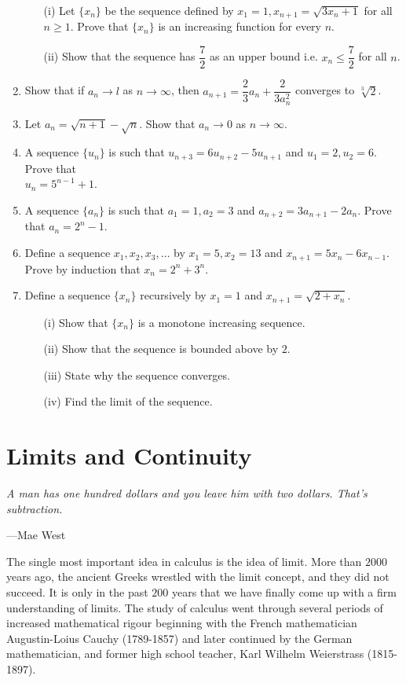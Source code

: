 \documentclass[titlepage,a4paper,12pt]{report}
\begin{document}
\begin{enumerate}
 \begin{itemize}
 \item[(i)] Let $\{x_n\}$ be the sequence defined by $x_1=1, x_{n+1}=\sqrt{3x_n+1}$ for all $n\geq 1$. Prove that $\{x_n\}$ is an increasing function for every $n$.
 \item[(ii)] Show that the sequence has $\dfrac{7}{2}$ as an upper bound i.e. $x_n \leq \dfrac{7}{2}$ for all $n$.
 \end{itemize}
 \item Show that if $a_n\rightarrow l$ as $n\rightarrow \infty$, then $a_{n+1}=\dfrac{2}{3}a_n +\dfrac{2}{3a_n ^2}$ converges to $\sqrt[3]{2}$.
 \item Let $a_n=\sqrt{n+1}-\sqrt{n}$. Show that $a_n\rightarrow 0$ as $n\rightarrow \infty$.
 \item A sequence $\{u_n\}$ is such that $u_{n+3}=6u_{n+2}-5u_{n+1}$ and $u_1=2, u_2=6$. Prove that\\ $u_n=5^{n-1}+1$.
 \item A sequence $\{a_n\}$ is such that $a_1=1, a_2=3$ and $a_{n+2}=3a_{n+1}-2a_n$. Prove that $a_n=2^n-1$.
 \item Define a sequence $x_1, x_2, x_3, \dots$ by $x_1=5, x_2=13$ and $x_{n+1}=5x_n-6x_{n-1}$. Prove by induction that $x_n=2^n+3^n$.
 \item Define a sequence $\{x_n\}$ recursively by $x_1=1$ and $x_{n+1}=\sqrt{2+x_n}$.
 \begin{itemize}
 \item[(i)] Show that $\{x_n\}$ is a monotone increasing sequence.
 \item[(ii)] Show that the sequence is bounded above by $2$.
 \item[(iii)] State why the sequence converges.
 \item[(iv)] Find the limit of the sequence.
 \end{itemize}
\end{enumerate}
\chapter{Limits and Continuity}
\begin{center}
	\small{\parbox{18cm}{
		\begin{raggedright}
		{\small
		\textit{A man has one hundred dollars and you leave him with two dollars.  That's subtraction.}
 }
 
				\vspace{.5cm}\hfill{---Mae West}
		\end{raggedright}
	}
} 
\end{center}
The single most important idea in calculus is the idea of limit. More than $2000$ years
ago, the ancient Greeks wrestled with the limit concept, and they did not succeed. It
is only in the past $200$ years that we have finally come up with a firm understanding
of limits. The study of calculus went through several periods of increased mathematical rigour beginning with the French mathematician Augustin-Loius Cauchy (1789-1857) and later continued by the German mathematician, and former high school teacher, Karl Wilhelm Weierstrass (1815-1897). 
\end{document}
